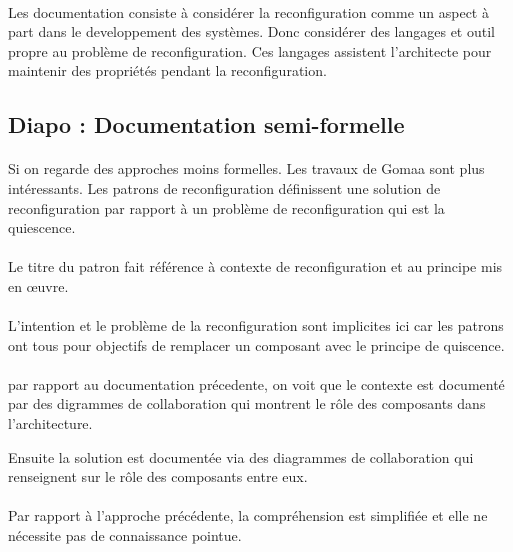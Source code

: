 \paragraph{} 
Les documentation consiste à considérer la reconfiguration
comme un aspect à part dans le developpement des systèmes. 
Donc considérer des langages et outil propre au
problème de reconfiguration. Ces langages assistent l'architecte pour
maintenir des propriétés pendant la reconfiguration. 

\subsection{Diapo : Documentation semi-formelle}
\paragraph{}
Si on regarde des approches moins formelles. Les travaux de Gomaa sont
plus intéressants. Les patrons de reconfiguration définissent une
solution de reconfiguration par rapport à un problème de
reconfiguration qui est la quiescence. 

\paragraph{}
Le titre du patron fait référence à contexte de reconfiguration et au
principe mis en \oe{}uvre. 

\paragraph{}
L'intention et le problème de la reconfiguration sont implicites ici
car les patrons ont tous pour objectifs de remplacer un composant avec
le principe de quiscence.

\paragraph{}
par rapport au documentation
précedente, on voit que le contexte est documenté par des digrammes de
collaboration qui montrent le rôle des composants dans l'architecture. 

Ensuite la solution est documentée via des diagrammes de collaboration qui
renseignent sur le rôle des composants entre eux. 

\paragraph{}
Par rapport à
l'approche précédente, la compréhension est simplifiée et elle ne
nécessite pas de connaissance pointue. 

